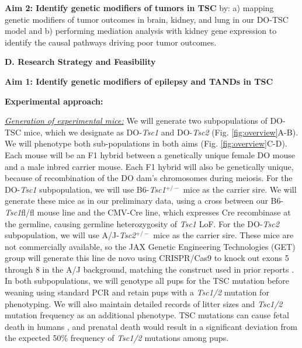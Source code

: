 \documentclass[
  12pt,
]{article}
\begin{document}
\textbf{Aim 2: Identify genetic modifiers of tumors in TSC} by: a)
mapping genetic modifiers of tumor outcomes in brain, kidney, and lung
in our DO-TSC model and b) performing mediation analysis with kidney
gene expression to identify the causal pathways driving poor tumor
outcomes.

\textbf{D. Research Strategy and Feasibility}

\textbf{Aim 1: Identify genetic modifiers of epilepsy and TANDs in TSC}

\textbf{Experimental approach:}

\textit{\underline{Generation of experimental mice:}} We will generate
two subpopulations of DO-TSC mice, which we designate as
DO-\textit{Tsc1} and DO-\textit{Tsc2} (Fig. \ref{fig:overview}A-B). We
will phenotype both sub-populations in both aims (Fig.
\ref{fig:overview}C-D). Each mouse will be an F1 hybrid between a
genetically unique female DO mouse and a male inbred carrier mouse. Each
F1 hybrid will also be genetically unique, because of recombination of
the DO dam's chromosomes during meiosis. For the DO-\textit{Tsc1}
subpopulation, we will use B6-\textit{Tsc1}\(^{+/-}\) mice as the
carrier sire. We will generate these mice as in our preliminary data,
using a cross between our B6-\textit{Tsc1}fl/fl mouse line and the
CMV-Cre line, which expresses Cre recombinase at the germline, causing
germline heterozygosity of \textit{Tsc1} LoF. For the DO-\textit{Tsc2}
subpopulation, we will use A/J-\textit{Tsc2}\(^{+/-}\) mice as the
carrier sire. These mice are not commercially available, so the JAX
Genetic Engineering Technologies (GET) group will generate this line de
novo using CRISPR/Cas9 to knock out exons 5 through 8 in the A/J
background, matching the construct used in prior reports
\cite{10491404, 20235887}. In both subpopulations, we will genotype all
pups for the TSC mutation before weaning using standard PCR and retain
pups with a \textit{Tsc1/2} mutation for phenotyping. We will also
maintain detailed records of litter sizes and \textit{Tsc1/2} mutation
frequency as an additional phenotype. TSC mutations can cause fetal
death in humans \cite{15731990, 28868251, 18236061}, and prenatal death
would result in a significant deviation from the expected 50\% frequency
of \textit{Tsc1/2} mutations among pups.
\end{document}
